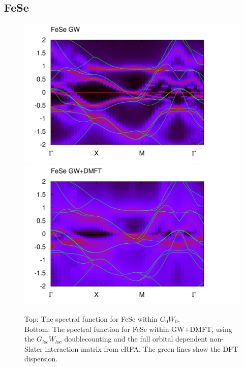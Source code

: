 \documentclass[12pt,a4paper]{scrartcl}
\numberwithin{equation}{section}
\begin{document}
\subsection{FeSe}
\begin{figure}[h]
\includegraphics[width=1\textwidth]{figs/results/FeSe_bands_GW.pdf} 
\includegraphics[width=1\textwidth]{figs/results/FeSe_bands_GWDMFT.pdf} 

\vspace*{-0.5cm}
\caption{Top: The spectral function for FeSe within $G_0W_0$.\\
Bottom: The spectral function for FeSe within GW+DMFT,
using the $G_{loc}W_{loc}$ doublecounting and the full orbital dependent 
non-Slater interaction matrix from cRPA. The green lines show the DFT dispersion.
}
\label{fig:results_BS_fese}
\end{figure}

\clearpage
\end{document}
